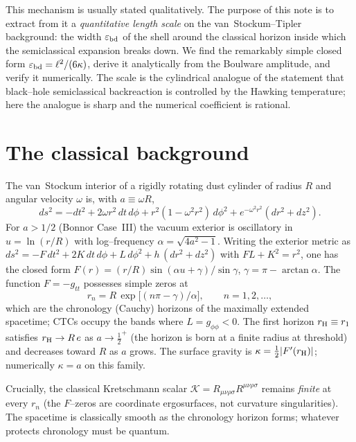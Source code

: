 \documentclass[11pt]{article}
\newcommand{\rH}{r_{\rm H}}
\newcommand{\ebd}{\varepsilon_{\rm bd}}
\begin{document}
This mechanism is usually stated qualitatively. The purpose of this note is to extract from it a
\emph{quantitative length scale} on the van~Stockum--Tipler background: the width $\ebd$ of the
shell around the classical horizon inside which the semiclassical expansion breaks down. We
find the remarkably simple closed form $\ebd=\ell^{2}/(6\kappa)$, derive it analytically from
the Boulware amplitude, and verify it numerically. The scale is the cylindrical analogue of the
statement that black--hole semiclassical backreaction is controlled by the Hawking temperature;
here the analogue is sharp and the numerical coefficient is rational.

\section{The classical background}
The van~Stockum interior of a rigidly rotating dust cylinder of radius $R$ and angular velocity
$\omega$ is, with $a\equiv\omega R$,
\[
ds^{2}=-dt^{2}+2\omega r^{2}\,dt\,d\phi+r^{2}(1-\omega^{2}r^{2})\,d\phi^{2}
+e^{-\omega^{2}r^{2}}(dr^{2}+dz^{2}).
\]
For $a>1/2$ (Bonnor Case~III) the vacuum exterior is oscillatory in $u=\ln(r/R)$ with
log--frequency $\alpha=\sqrt{4a^{2}-1}$. Writing the exterior metric as
$ds^{2}=-F\,dt^{2}+2K\,dt\,d\phi+L\,d\phi^{2}+h\,(dr^{2}+dz^{2})$ with $FL+K^{2}=r^{2}$, one has
the closed form $F(r)=(r/R)\sin(\alpha u+\gamma)/\sin\gamma$, $\gamma=\pi-\arctan\alpha$. The
function $F=-g_{tt}$ possesses simple zeros at
\[
r_{n}=R\,\exp\!\big[(n\pi-\gamma)/\alpha\big],\qquad n=1,2,\dots,
\]
which are the chronology (Cauchy) horizons of the maximally extended spacetime; CTCs occupy the
bands where $L=g_{\phi\phi}<0$. The first horizon $\rH\equiv r_{1}$ satisfies $\rH\to R\,e$ as
$a\to\tfrac12^{+}$ (the horizon is born at a finite radius at threshold) and decreases toward
$R$ as $a$ grows. The surface gravity is $\kappa=\tfrac12|F'(\rH)|$; numerically $\kappa=a$ on
this family.

Crucially, the classical Kretschmann scalar $\mathcal{K}=R_{\mu\nu\rho\sigma}R^{\mu\nu\rho\sigma}$
remains \emph{finite} at every $r_{n}$ (the $F$--zeros are coordinate ergosurfaces, not curvature
singularities). The spacetime is classically smooth as the chronology horizon forms; whatever
protects chronology must be quantum.
\end{document}
